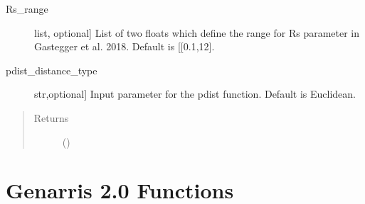 \documentclass[letterpaper,10pt,english]{sphinxmanual}
\begin{document}
\begin{fulllineitems}
\begin{fulllineitems}
\begin{description}
\item[{Rs\_range}] \leavevmode{[}list, optional{]}
List of two floats which define the range for Rs parameter in
Gastegger et al. 2018. Default is {[}{[}0.1,12{]}.

\item[{pdist\_distance\_type}] \leavevmode{[}str,optional{]}
Input parameter for the pdist function. Default is Euclidean.

\end{description}
\begin{quote}\begin{description}
\item[{Returns}] \leavevmode
{} ()

\end{description}\end{quote}

\end{fulllineitems}


\end{fulllineitems}



\chapter{Genarris 2.0 Functions}
\label{\detokenize{index:genarris-2-0-functions}}
\end{document}
